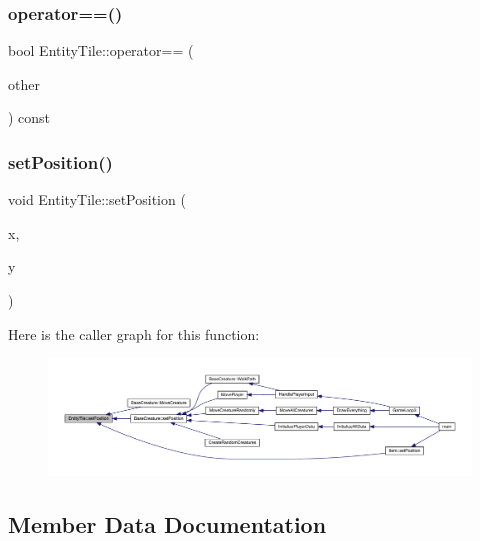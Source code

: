 \subsubsection{\texorpdfstring{operator==()}{operator==()}}
{\footnotesize\ttfamily bool Entity\+Tile\+::operator== (\begin{DoxyParamCaption}\item[{const \mbox{\hyperlink{class_entity_tile}{Entity\+Tile}} \&}]{other }\end{DoxyParamCaption}) const}

\mbox{\label{class_entity_tile_a7b9e5be8dc4017eb5af8e4fda7add3c4}} 
\subsubsection{\texorpdfstring{set\+Position()}{setPosition()}}
{\footnotesize\ttfamily void Entity\+Tile\+::set\+Position (\begin{DoxyParamCaption}\item[{int}]{x,  }\item[{int}]{y }\end{DoxyParamCaption})}

Here is the caller graph for this function\+:
\nopagebreak
\begin{figure}[H]
\begin{center}
\leavevmode
\includegraphics[width=350pt]{d7/dd4/class_entity_tile_a7b9e5be8dc4017eb5af8e4fda7add3c4_icgraph}
\end{center}
\end{figure}


\subsection{Member Data Documentation}
\mbox{\label{class_entity_tile_a12416c687d821f5c9d8272b94c5764d4}} 
